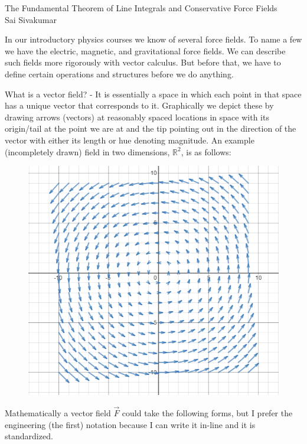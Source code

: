 \documentclass[11pt]{article}
\begin{document}
\setcounter{page}{1}

\begin{center}
The Fundamental Theorem of Line Integrals and Conservative Force Fields\\
Sai Sivakumar
\end{center}

In our introductory physics courses we know of several force fields. To name a few we have the electric, magnetic, and gravitational force fields. We can describe such fields more rigorously with vector calculus. But before that, we have to define certain operations and structures before we do anything.

What is a vector field?  - It is essentially a space in which each point in that space has a unique vector that corresponds to it. Graphically we depict these by drawing arrows (vectors) at reasonably spaced locations in space with its origin/tail at the point we are at and the tip pointing out in the direction of the vector with either its length or hue denoting magnitude. An example (incompletely drawn) field in two dimensions, $\mathbb{R}^2$, is as follows:

\begin{figure}[h]
\centering
\includegraphics[scale=0.75]{examplefield}
\end{figure}

Mathematically a vector field $\vec{F}$ could take the following forms, but I prefer the engineering (the first) notation because I can write it in-line and it is standardized.
\end{document}
